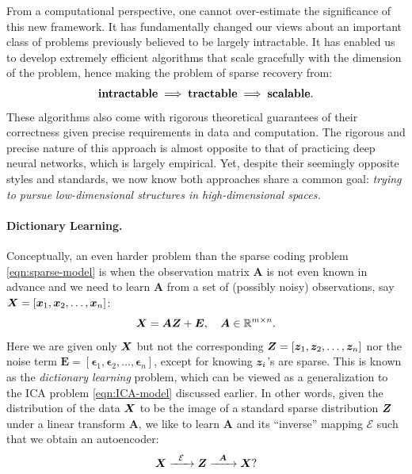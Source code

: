 \documentclass[../../book-main.tex]{subfiles}
\begin{document}
From a computational perspective, one cannot over-estimate the significance of this new framework. It has fundamentally changed our views about an important class of problems previously believed to be largely intractable. It has enabled us to develop extremely efficient algorithms that scale gracefully with the dimension of the problem, hence making the problem of sparse recovery from:
\begin{equation}
    \mbox{\textbf{intractable}} \;
   \Longrightarrow \; \mbox{\textbf{tractable}} \; \Longrightarrow \; 
   \mbox{\textbf{scalable}}.
\end{equation}
These algorithms also come with rigorous theoretical guarantees of their correctness given precise requirements in data and computation. The rigorous and precise nature of this approach is almost opposite to that of practicing deep neural networks, which is largely empirical. Yet, despite their seemingly opposite styles and standards, we now know both approaches share a common goal: {\em trying to pursue low-dimensional structures in high-dimensional spaces.}

\paragraph{Dictionary Learning.}
Conceptually, an even harder problem than the sparse coding problem \eqref{eqn:sparse-model} is when the observation matrix $\boldsymbol{A}$ is not even known in advance and we need to learn $\boldsymbol{A}$ from a set of (possibly noisy) observations, say $\bm{X} = [\bm{x}_1, \bm{x}_2, \ldots, \bm{x}_n]$:
\begin{equation}
    \bm{X} = \boldsymbol{A} \bm{Z} + \boldsymbol{E}, \quad \boldsymbol{A} \in \mathbb{R}^{m\times n}.
    \label{eqn:dictionary-learning}
\end{equation}
Here we are given only $\bm{X}$ but not the corresponding $\bm{Z} = [\bm{z}_1, \bm{z}_2, \ldots, \bm{z}_n]$ nor the noise term $\boldsymbol{E}= [\boldsymbol{\epsilon}_1, \boldsymbol{\epsilon}_2, \ldots, \boldsymbol{\epsilon}_n]$, except for knowing $\bm{z}_i$'s are sparse. This is known as the {\em dictionary learning} problem, which can be viewed as a generalization to the ICA problem \eqref{eqn:ICA-model} discussed earlier. In other words, given the distribution of the data $\bm{X}$ to be the image of a standard sparse distribution $\bm{Z}$ under a linear transform $\boldsymbol{A}$, we like to learn $\boldsymbol{A}$ and its ``inverse'' mapping $\mathcal{E}$ such that we obtain an autoencoder:
\begin{equation}
    \bm{X}   \xrightarrow{\hspace{2mm} \mathcal{E} \hspace{2mm}}  \bm{Z} \xrightarrow{\hspace{2mm} \boldsymbol{A} \hspace{2mm}} \bm{X}?
       \label{eqn:decoding-DL}
\end{equation}
\end{document}
